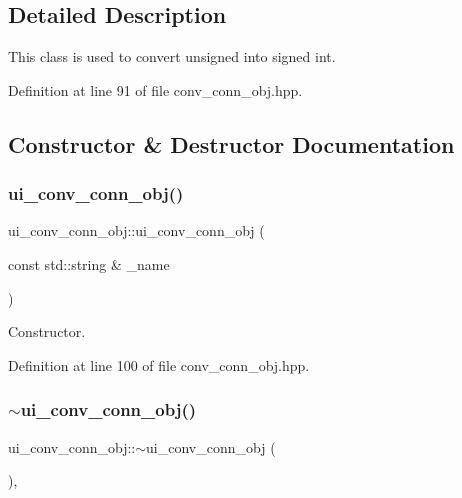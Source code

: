 \subsection{Detailed Description}
This class is used to convert unsigned into signed int. 

Definition at line 91 of file conv\+\_\+conn\+\_\+obj.\+hpp.



\subsection{Constructor \& Destructor Documentation}
\mbox{\label{classui__conv__conn__obj_a190bc2f0e639971e0daddf5e9807f3eb}} 
\subsubsection{\texorpdfstring{ui\+\_\+conv\+\_\+conn\+\_\+obj()}{ui\_conv\_conn\_obj()}}
{\footnotesize\ttfamily ui\+\_\+conv\+\_\+conn\+\_\+obj\+::ui\+\_\+conv\+\_\+conn\+\_\+obj (\begin{DoxyParamCaption}\item[{const std\+::string \&}]{\+\_\+name }\end{DoxyParamCaption})\hspace{0.3cm}{\ttfamily [inline]}}



Constructor. 



Definition at line 100 of file conv\+\_\+conn\+\_\+obj.\+hpp.

\mbox{\label{classui__conv__conn__obj_a9324f326d156144f97c1ad53085e9e93}} 
\subsubsection{\texorpdfstring{$\sim$ui\+\_\+conv\+\_\+conn\+\_\+obj()}{~ui\_conv\_conn\_obj()}}
{\footnotesize\ttfamily ui\+\_\+conv\+\_\+conn\+\_\+obj\+::$\sim$ui\+\_\+conv\+\_\+conn\+\_\+obj (\begin{DoxyParamCaption}{ }\end{DoxyParamCaption})\hspace{0.3cm}{\ttfamily [override]}, {\ttfamily [default]}}



